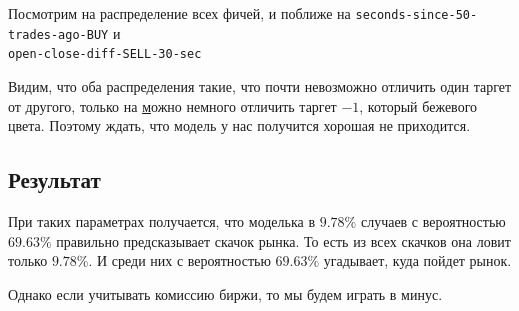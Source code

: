Посмотрим на распределение всех фичей, и поближе на \texttt{seconds-since-50-trades-ago-BUY} и \\ \texttt{open-close-diff-SELL-30-sec}

\begin{figure}[H]
\centering
{}
\end{figure}


\begin{figure}[H]
\centering
{}
\end{figure}

Видим, что оба распределения такие, что почти невозможно отличить один таргет от другого, только на \href{fig:trades_ago} можно немного отличить таргет $-1$, который бежевого цвета. Поэтому ждать, что модель у нас получится хорошая не приходится.



\subsection{Результат}
При таких параметрах получается, что моделька в $9.78\%$ случаев с вероятностью $69.63\%$ правильно предсказывает скачок рынка. То есть из всех скачков она ловит только $9.78\%$. И среди них с вероятностью $69.63\%$ угадывает, куда пойдет рынок.

Однако если учитывать комиссию биржи, то мы будем играть в минус.
